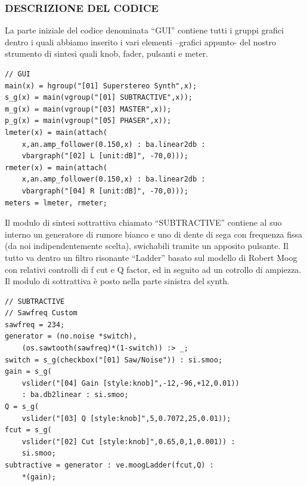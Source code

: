 \documentclass[
	a4paper,
	twocolumn
	]{article}
\begin{document}
\subsubsection*{DESCRIZIONE DEL CODICE}
La parte iniziale del codice denominata “GUI” contiene tutti i gruppi grafici dentro i quali abbiamo inserito i vari elementi –grafici appunto- del nostro strumento di sintesi quali knob, fader, pulsanti e meter.

\begin{lstlisting}
// GUI
main(x) = hgroup("[01] Superstereo Synth",x);
s_g(x) = main(vgroup("[01] SUBTRACTIVE",x));
m_g(x) = main(vgroup("[03] MASTER",x));
p_g(x) = main(vgroup("[05] PHASER",x));
lmeter(x) = main(attach(
	x,an.amp_follower(0.150,x) : ba.linear2db :
	vbargraph("[02] L [unit:dB]", -70,0)));
rmeter(x) = main(attach(
	x,an.amp_follower(0.150,x) : ba.linear2db :
	vbargraph("[04] R [unit:dB]", -70,0)));
meters = lmeter, rmeter;
\end{lstlisting}

Il modulo di sintesi sottrattiva chiamato “SUBTRACTIVE” contiene al suo interno un generatore di rumore bianco e uno di dente di sega con frequenza fissa (da noi indipendentemente scelta), swichabili tramite un apposito pulsante. Il tutto va dentro un filtro risonante “Ladder” basato sul modello di Robert Moog con relativi controlli di f cut e Q factor, ed in seguito ad un cotrollo di ampiezza.
Il modulo di sottrattiva è posto nella parte sinistra del synth.




\begin{lstlisting}
// SUBTRACTIVE
// Sawfreq Custom
sawfreq = 234;
generator = (no.noise *switch),
	(os.sawtooth(sawfreq)*(1-switch)) :> _;
switch = s_g(checkbox("[01] Saw/Noise")) : si.smoo;
gain = s_g(
	vslider("[04] Gain [style:knob]",-12,-96,+12,0.01))
	: ba.db2linear : si.smoo;
Q = s_g(
	vslider("[03] Q [style:knob]",5,0.7072,25,0.01));
fcut = s_g(
	vslider("[02] Cut [style:knob]",0.65,0,1,0.001)) :
	si.smoo;
subtractive = generator : ve.moogLadder(fcut,Q) :
	*(gain);
\end{lstlisting}
\end{document}
